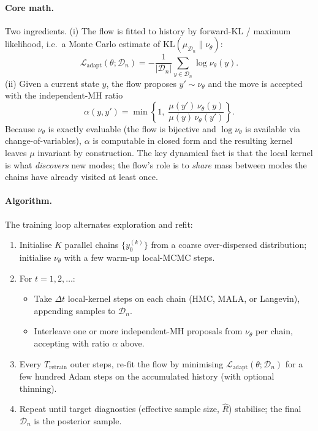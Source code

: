\documentclass[11pt,letterpaper]{article}
\newcommand{\KLdiv}{\mathrm{KL}}
\theoremstyle{plain}
\begin{document}
\paragraph{Core math.} Two ingredients. (i) The flow is fitted to history by
forward-KL / maximum likelihood, i.e.\ a Monte Carlo estimate of
$\KLdiv(\mu_{\mathcal D_n}\|\nu_\theta)$:
\[
  \mathcal L_{\mathrm{adapt}}(\theta;\mathcal D_n) = -\frac{1}{|\mathcal D_n|}\sum_{y\in\mathcal D_n}\log\nu_\theta(y).
\]
(ii) Given a current state $y$, the flow proposes $y'\sim\nu_\theta$ and the
move is accepted with the independent-MH ratio
\[
  \alpha(y,y') = \min\!\left\{1,\;\frac{\mu(y')\,\nu_\theta(y)}{\mu(y)\,\nu_\theta(y')}\right\}.
\]
Because $\nu_\theta$ is exactly evaluable (the flow is bijective and
$\log\nu_\theta$ is available via change-of-variables), $\alpha$ is computable in
closed form and the resulting kernel leaves $\mu$ invariant by construction. The
key dynamical fact is that the local kernel is what \emph{discovers} new modes;
the flow's role is to \emph{share} mass between modes the chains have already
visited at least once.

\paragraph{Algorithm.} The training loop alternates exploration and refit:
\begin{enumerate}\setlength{\itemsep}{2pt}
  \item Initialise $K$ parallel chains $\{y^{(k)}_0\}$ from a coarse over-dispersed
    distribution; initialise $\nu_\theta$ with a few warm-up local-MCMC steps.
  \item For $t=1,2,\ldots$:
    \begin{itemize}\setlength{\itemsep}{1pt}
      \item Take $\Delta t$ local-kernel steps on each chain (HMC, MALA, or
        Langevin), appending samples to $\mathcal D_n$.
      \item Interleave one or more independent-MH proposals from $\nu_\theta$ per
        chain, accepting with ratio $\alpha$ above.
    \end{itemize}
  \item Every $T_{\mathrm{retrain}}$ outer steps, re-fit the flow by minimising
    $\mathcal L_{\mathrm{adapt}}(\theta;\mathcal D_n)$ for a few hundred Adam
    steps on the accumulated history (with optional thinning).
  \item Repeat until target diagnostics (effective sample size, $\hat R$)
    stabilise; the final $\mathcal D_n$ is the posterior sample.
\end{enumerate}
\end{document}
